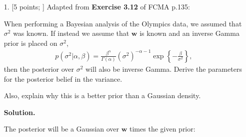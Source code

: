 \documentclass[10pt]{article}
\begin{document}
\newpage
\begin{itemize}

\item[1.]  [5 points; \boldred{Required only for Graduates}]
Adapted from {\bf Exercise 3.12} of FCMA p.135:

When performing a Bayesian analysis of the Olympics data, we assumed that $\sigma^2$ was known.  If instead we assume that $\mathbf{w}$ is known and an inverse Gamma prior is placed on $\sigma^2$,
\begin{eqnarray*}
p(\sigma^2 | \alpha, \beta) = \frac{\beta^{\alpha}}{\Gamma(\alpha)} (\sigma^2)^{-\alpha-1} \exp \left\{-\frac{\beta}{\sigma^2} \right\},
\end{eqnarray*}
then the posterior over $\sigma^2$ will also be inverse Gamma.  Derive the parameters for the posterior belief in the variance.  

Also, explain why this is a better prior than a Gaussian density.

{\bf Solution.}

The posterior will be a Gaussian over $\mathbf{w}$ times the given prior:


\end{itemize}
\end{document}
